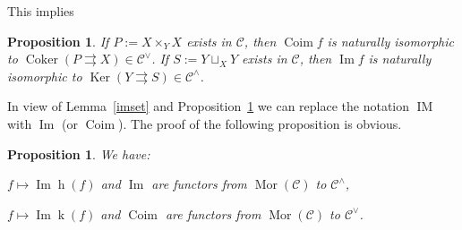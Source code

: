 \documentclass[12pt]{article}
\newtheorem{prop}[thm]{Proposition}
\theoremstyle{remark}
\theoremstyle{definition}
\newcommand{\C}{\mathcal C}
\newcommand{\parar}{\rightrightarrows}
\DeclareMathOperator{\Coim}{Coim}
\DeclareMathOperator{\Coker}{Coker}
\DeclareMathOperator{\Ima}{Im}
\DeclareMathOperator{\IM}{IM}
\DeclareMathOperator{\hy}{h}
\DeclareMathOperator{\ky}{k}
\DeclareMathOperator{\Ker}{Ker}
\DeclareMathOperator{\Mor}{Mor}
\begin{document}
This implies 
%
\begin{prop}\label{coimim}
If $P:=X\times_YX$ exists in $\C$, then $\Coim f$ is naturally isomorphic to $\Coker(P\parar X)\in\C^\vee$. If $S:=Y\sqcup_XY$ exists in $\C$, then $\Ima f$ is naturally isomorphic to $\Ker(Y\parar S)\in\C^\wedge$. 
\end{prop} 
% 

In view of Lemma~\ref{imset} and Proposition~\ref{coimim} we can replace the notation $\IM$ with $\Ima$ (or $\Coim$). The proof of the following proposition is obvious. 
%
\begin{prop}\label{fun}
We have: 

$f\mapsto\Ima\hy(f)$ and $\Ima$ are functors from $\Mor(\C)$ to $\C^\wedge$, 

$f\mapsto\Ima\ky(f)$ and $\Coim$ are functors from $\Mor(\C)$ to $\C^\vee$. 
%
\end{prop}
%
%
\end{document}
